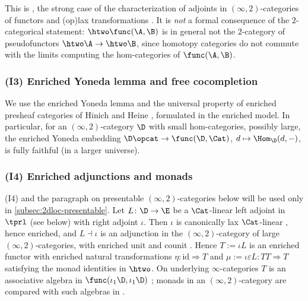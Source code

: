 This is \cite[Cor.~5.2.12]{abellangagnahaugseng2024straightening}, the strong case of the characterization of adjoints in $(\infty,2)$-categories of functors and (op)lax transformations \cite[Cor.~5.2.10]{abellangagnahaugseng2024straightening}.
It is \emph{not} a formal consequence of the $2$-categorical statement: $\htwo\func(\A,\B)$ is in general not the $2$-category of pseudofunctors $\htwo\A \to \htwo\B$, since homotopy categories do not commute with the limits computing the hom-categories of $\func(\A,\B)$.

\subsubsection*{(I3) Enriched Yoneda lemma and free cocompletion}
We use the enriched Yoneda lemma and the universal property of enriched presheaf categories of Hinich \cite{hinich2020yoneda} and Heine \cite{heine2023enriched}, formulated in the enriched model. In particular, for an $(\infty,2)$-category $\D$ with small hom-categories, possibly large, the enriched Yoneda embedding $\D\opcat \to \func(\D,\Cat)$, $d \mapsto \Hom_{\D}(d,-)$, is fully faithful (in a larger universe).

\subsubsection*{(I4) Enriched adjunctions and monads}
(I4) and the paragraph on presentable $(\infty,2)$-categories below will be used only in \cref{subsec:2dloc-presentable}.
Let $L\colon \D \to \E$ be a $\Cat$-linear left adjoint in $\tprl$ (see below) with right adjoint $\iota$. Then $\iota$ is canonically lax $\Cat$-linear \cite[7.3.2.7]{ha}, hence enriched, and $L \dashv \iota$ is an adjunction in the $(\infty,2)$-category of large $(\infty,2)$-categories, with enriched unit and counit \cite{heine2023enriched}.
Hence $T := \iota L$ is an enriched functor with enriched natural transformations $\eta\colon \mathrm{id} \Rightarrow T$ and $\mu := \iota\varepsilon L\colon TT \Rightarrow T$ satisfying the monad identities in $\htwo$. On underlying $\infty$-categories $T$ is an associative algebra in $\func(\iota_{1}\D,\iota_{1}\D)$ \cite[\S 4.7.3]{ha}; monads in an $(\infty,2)$-category are compared with such algebras in \cite{haugseng2021laxmonads}.

